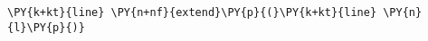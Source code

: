 \begin{Verbatim}[commandchars=\\\{\}]
    \PY{k+kt}{line} \PY{n+nf}{extend}\PY{p}{(}\PY{k+kt}{line} \PY{n}{l}\PY{p}{)}
\end{Verbatim}
